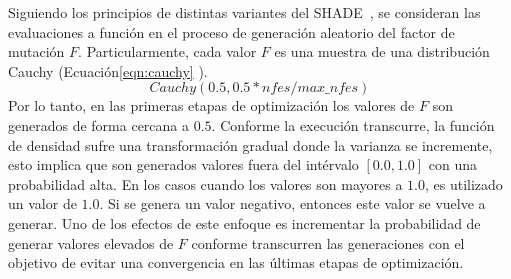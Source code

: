 Siguiendo los principios de distintas variantes del SHADE~\cite{awad2016ensemble, brest2016shade}, se consideran las evaluaciones a función en el proceso de generación aleatorio del factor de mutación $F$.
%
Particularmente, cada valor $F$ es una muestra de una distribución Cauchy (Ecuación\ref{eqn:cauchy} ).
\begin{equation}\label{eqn:cauchy}
 Cauchy(0.5, 0.5*nfes/max\_nfes)
\end{equation}
%
Por lo tanto, en las primeras etapas de optimización los valores de $F$ son generados de forma cercana a $0.5$.
%
Conforme la execución transcurre, la función de densidad sufre una transformación gradual donde la varianza se incremente, esto implica que son generados valores fuera del intérvalo $[0.0, 1.0]$ con una probabilidad alta.
%
En los casos cuando los valores son mayores a $1.0$, es utilizado un valor de $1.0$.
%
Si se genera un valor negativo, entonces este valor se vuelve a generar.
%
Uno de los efectos de este enfoque es incrementar la probabilidad de generar valores elevados de $F$ conforme transcurren las generaciones con el objetivo de evitar una convergencia en las últimas etapas de optimización.



